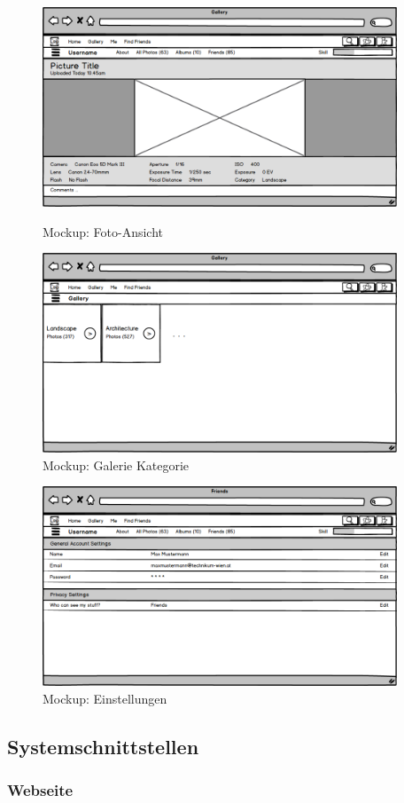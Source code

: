 \documentclass[a4paper,bibtotoc,oneside]{scrartcl}	%
\begin{document}
			\begin{figure}[H]
				\includegraphics[width=400px]{Mockups/09_user_gallery_photo.jpeg}
				\caption{Mockup: Foto-Ansicht}
				\includegraphics[width=400px]{Mockups/10_gallery_cat.jpeg}
				\caption{Mockup: Galerie Kategorie}
			\end{figure}
			\begin{figure}[H]
				\includegraphics[width=400px]{Mockups/11_setting.jpeg}
				\caption{Mockup: Einstellungen}
			\end{figure}
	\subsection{Systemschnittstellen}
		\subsubsection{Webseite}
\end{document}
